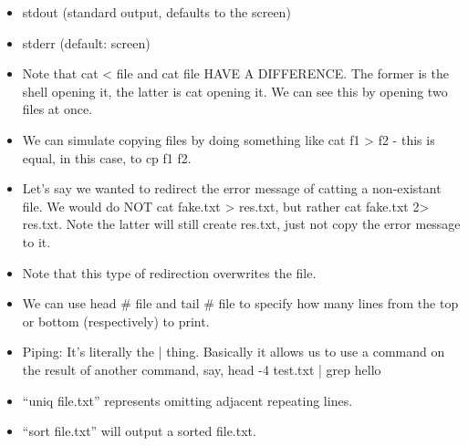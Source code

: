 \documentclass{article}
\begin{document}
\begin{itemize}
\begin{itemize}
\item  stdout (standard output, defaults to the screen)
\item  stderr (default: screen)
\item  Note that cat < file and cat file HAVE A DIFFERENCE.  The former is the shell opening it, the latter is cat opening it.  We can see this by opening two files at once.
\item  We can simulate copying files by doing something like cat f1 > f2 - this is equal, in this case, to cp f1 f2.
\item  Let's say we wanted to redirect the error message of catting a non-existant file.  We would do NOT cat fake.txt > res.txt, but rather cat fake.txt 2> res.txt.  Note the latter will still create res.txt, just not copy the error message to it.
\item  Note that this type of redirection overwrites the file.
\item  We can use head \-\# file and tail \-\# file to specify how many lines from the top or bottom (respectively) to print.
\item  Piping:  It's literally the | thing.  Basically it allows us to use a command on the result of another command, say, head -4 test.txt | grep hello
\item  ``uniq file.txt'' represents omitting adjacent repeating lines.
\item  ``sort file.txt'' will output a sorted file.txt.

\end{itemize}
\end{itemize}
\end{document}
